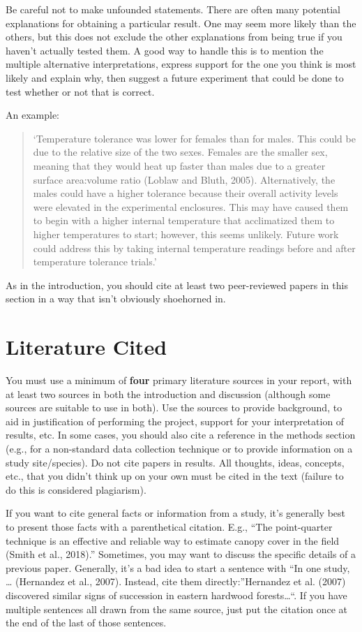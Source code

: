 \documentclass[]{book}
\begin{document}
Be careful not to make unfounded statements. There are often many
potential explanations for obtaining a particular result. One may seem
more likely than the others, but this does not exclude the other
explanations from being true if you haven't actually tested them. A good
way to handle this is to mention the multiple alternative
interpretations, express support for the one you think is most likely
and explain why, then suggest a future experiment that could be done to
test whether or not that is correct.

An example:

\begin{quote}
`Temperature tolerance was lower for females than for males. This could
be due to the relative size of the two sexes. Females are the smaller
sex, meaning that they would heat up faster than males due to a greater
surface area:volume ratio (Loblaw and Bluth, 2005). Alternatively, the
males could have a higher tolerance because their overall activity
levels were elevated in the experimental enclosures. This may have
caused them to begin with a higher internal temperature that
acclimatized them to higher temperatures to start; however, this seems
unlikely. Future work could address this by taking internal temperature
readings before and after temperature tolerance trials.'
\end{quote}

As in the introduction, you should cite at least two peer-reviewed
papers in this section in a way that isn't obviously shoehorned in.

\section{Literature Cited}\label{literature-cited}

You must use a minimum of \textbf{four} primary literature sources in
your report, with at least two sources in both the introduction and
discussion (although some sources are suitable to use in both). Use the
sources to provide background, to aid in justification of performing the
project, support for your interpretation of results, etc. In some cases,
you should also cite a reference in the methods section (e.g., for a
non-standard data collection technique or to provide information on a
study site/species). Do not cite papers in results. All thoughts, ideas,
concepts, etc., that you didn't think up on your own must be cited in
the text (failure to do this is considered plagiarism).

If you want to cite general facts or information from a study, it's
generally best to present those facts with a parenthetical citation.
E.g., ``The point-quarter technique is an effective and reliable way to
estimate canopy cover in the field (Smith et al., 2018).'' Sometimes,
you may want to discuss the specific details of a previous paper.
Generally, it's a bad idea to start a sentence with ``In one study,
\ldots{} (Hernandez et al., 2007). Instead, cite them
directly:''Hernandez et al. (2007) discovered similar signs of
succession in eastern hardwood forests\ldots{}``. If you have multiple
sentences all drawn from the same source, just put the citation once at
the end of the last of those sentences.
\end{document}
